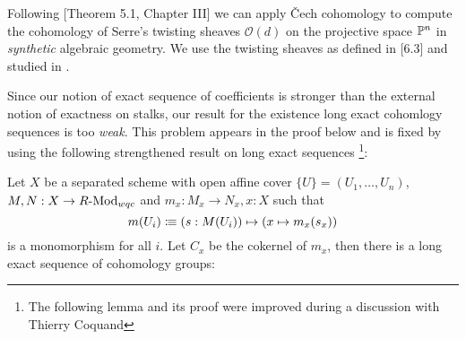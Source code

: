 
Following \cite{Hartshorne}[Theorem 5.1, Chapter III] we can apply \v{C}ech cohomology to compute
the cohomology of Serre's twisting sheaves $\mathcal O(d)$ on the projective space $\mathbb{P}^n$ in \emph{synthetic} algebraic geometry.
We use the twisting sheaves as defined in \cite{draft}[6.3] and studied in \cite{sag-projective}.

Since our notion of exact sequence of coefficients is stronger than the external notion of exactness on stalks, our result for the existence long exact cohomlogy sequences is too \emph{weak}.
This problem appears in the proof below and is fixed by using the following strengthened result on long exact sequences
\footnote{The following lemma and its proof were improved during a discussion with Thierry Coquand}:

\begin{lemma}
  \label{local-les}
  Let $X$ be a separated scheme with open affine cover $\{U\}=(U_1,\dots,U_n)$,
  $M,N:X\to R\text{-}\mathrm{Mod}_{wqc}$ and $m_x:M_x\to N_x, x:X$ such that
  \[
    m(U_i)\vcentcolon\mspace{-1.2mu}\equiv (s:M(U_i)) \mapsto (x\mapsto m_x(s_x))
  \]
  is a monomorphism for all $i$.
  Let $C_x$ be the cokernel of $m_x$, then there is a long exact sequence of cohomology groups:
  \begin{center}
  \end{center}
\end{lemma}

